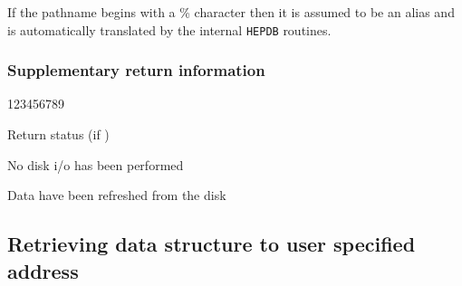If the pathname begins with a \% character then it is assumed to be
an alias and is automatically translated by the internal {\tt HEPDB}
routines.

\subsubsection*{Supplementary return information}

\begin{DLtt}{123456789}
\item[IQUEST(2)]Return status (if )
%
  \begin{DLtt}{1}
    \item[0]No disk i/o has been performed
    \item[1]Data have been refreshed from the disk
  \end{DLtt}
\end{DLtt}

\subsection{Retrieving data structure to user specified address}


